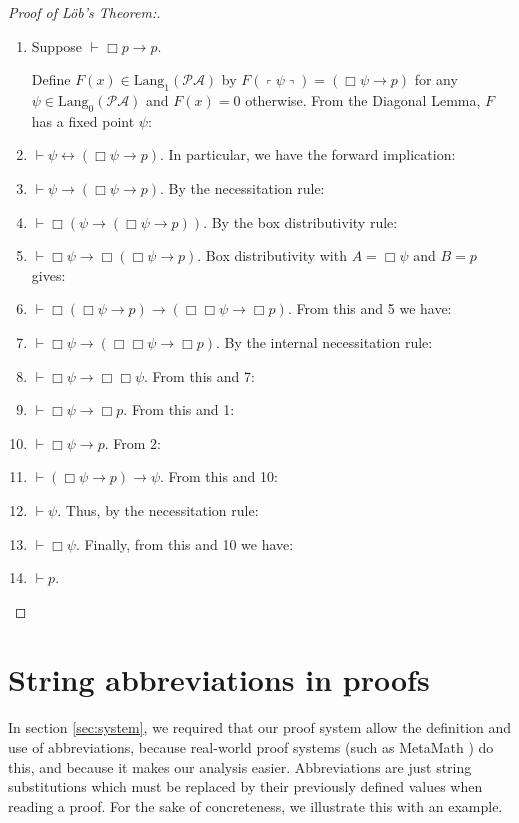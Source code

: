 \documentclass[onecolumn]{miri-tech-article}
\numberwithin{equation}{section}
\theoremstyle{definition}
\newcommand{\PA}{\mathcal{P}\!\mathcal{A}}
\newcommand{\Lang}{\mathrm{Lang}}
\newcommand{\qquote}[1]{\left\ulcorner #1 \right\urcorner}
\renewcommand{\-}{^{-1}}
\begin{document}
\begin{proof}[Proof of L\"{o}b's Theorem:]\ 

\begin{enumerate}
\item Suppose $\vdash \Box p \rightarrow p$.

Define $F(x) \in \Lang_1(\PA)$ by $F(\qquote\psi) = (\Box \psi \rightarrow p)$ for any $\psi \in \Lang_0(\PA)$ and $F(x) = 0$ otherwise.  From the Diagonal Lemma, $F$ has a fixed point $\psi$:

\item $\vdash \psi \leftrightarrow (\Box \psi \rightarrow p)$.  In particular, we have the forward implication:
\item $\vdash \psi \rightarrow (\Box \psi \rightarrow p)$.  By the necessitation rule:
\item $\vdash \Box(\psi \rightarrow (\Box \psi \rightarrow p))$.  By the box distributivity rule:
\item $\vdash \Box\psi \rightarrow \Box(\Box \psi \rightarrow p)$.  Box distributivity with $ A = \Box \psi $ and $ B= p$ gives:
\item $\vdash \Box(\Box \psi \rightarrow p) \rightarrow (\Box\Box\psi \rightarrow \Box p)$.  From this and 5 we have:
\item $\vdash \Box \psi \rightarrow (\Box\Box\psi \rightarrow \Box p)$.  By the internal necessitation rule:
\item $\vdash \Box \psi \rightarrow \Box \Box \psi$.  From this and 7:
\item $\vdash \Box \psi \rightarrow \Box p$.  From this and 1:
\item $\vdash \Box \psi \rightarrow p$.  From 2:
\item $\vdash (\Box \psi \rightarrow p) \rightarrow \psi$.  From this and 10:
\item $\vdash \psi$.  Thus, by the necessitation rule:
\item $\vdash \Box \psi$.  Finally, from this and 10 we have:
\item $\vdash p$.
\end{enumerate}

\end{proof}


\section{String abbreviations in proofs}

In section \ref{sec:system}, we required that our proof system allow the definition and use of abbreviations, because real-world proof systems (such as MetaMath \cite{Megill:2007}) do this, and because it makes our analysis easier.  Abbreviations are just string substitutions which must be replaced by their previously defined values when reading a proof.  For the sake of concreteness, we illustrate this with an example.
\end{document}
